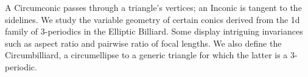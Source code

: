 A Circumconic passes through a triangle's vertices; an Inconic is tangent to the sidelines. We study the variable geometry of certain conics derived from the 1d family of 3-periodics in the Elliptic Billiard. Some display intriguing invariances such as aspect ratio and pairwise ratio of focal lengths. We also define the Circumbilliard, a circumellipse to a generic triangle for which the latter is a 3-periodic.

